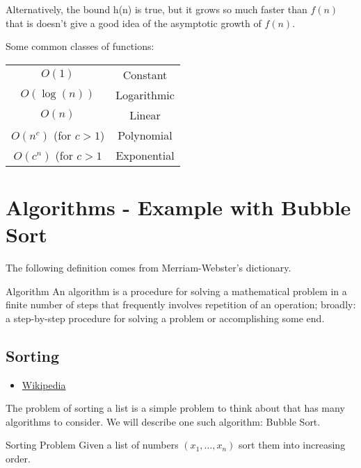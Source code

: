 Alternatively, the bound h(n) is true, but it grows so much faster than $f(n)$ that is doesn't give a good idea of the asymptotic growth of $f(n)$.




Some common classes of functions:
\begin{center}
\begin{tabular}{|c|c|}
\hline
$O(1)$ & Constant\\
$O(\log(n))$ & Logarithmic\\
$O(n)$ & Linear\\
$O(n^c)$ (for $c > 1$) & Polynomial\\
$O(c^n)$  (for $c > 1$ & Exponential\\
\hline
\end{tabular}
\end{center}
\begin{center}
\end{center}
\section{Algorithms - Example with Bubble Sort}
The following definition comes from Merriam-Webster's dictionary.
\begin{definition}{Algorithm}{}
An algorithm is a procedure for solving a mathematical problem in a finite number of steps that frequently involves repetition of an operation; broadly: a step-by-step procedure for solving a problem or accomplishing some end.
\end{definition}
\subsection{Sorting }
\begin{resource}
\begin{itemize}
\item \href{https://en.wikipedia.org/wiki/Bubble_sort}{Wikipedia}
\end{itemize}
\end{resource}

The problem of sorting a list is a simple problem to think about that has many algorithms to consider.  We will describe one such algorithm: Bubble Sort. 

\begin{general}{Sorting Problem}{\polynomial}{}
Given a list of numbers $(x_1, \dots, x_n)$ sort them into increasing order.  
\end{general}

